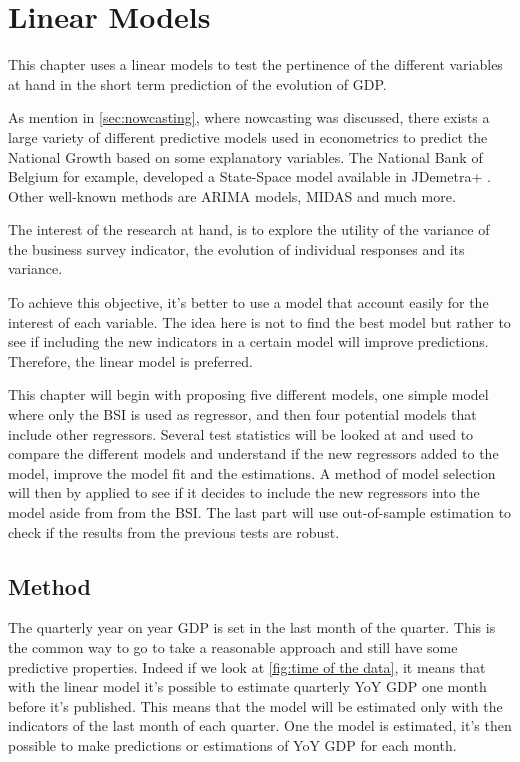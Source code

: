 \documentclass[12pt,a4paper,oneside]{book}
\begin{document}
\chapter{Linear Models}

This chapter uses a linear models to test the pertinence of the different variables at hand in the short term prediction of the evolution of GDP.

As mention in \autoref{sec:nowcasting}, where nowcasting was discussed, there exists a large variety of different predictive models used in econometrics to predict the National Growth based on some explanatory variables.
The National Bank of Belgium for example, developed a State-Space model available in JDemetra+ \cite{de_antonio_liedo_nowcasting_2014}. Other well-known methods are ARIMA models, MIDAS and much more.

The interest of the research at hand, is to explore the utility of the variance of the business survey indicator, the evolution of individual responses and its variance.

To achieve this objective, it's better to use a model that account easily for the interest of each variable. The idea here is not to find the best model but rather to see if including the new indicators in a certain model will improve predictions.
Therefore, the linear model is preferred.

This chapter will begin with proposing five different models, one simple model where only the BSI is used as regressor, and then four potential models that include other regressors.
Several test statistics will be looked at and used to compare the different models and understand if the new regressors added to the model, improve the model fit and the estimations.
A method of model selection will then by applied to see if it decides to include the new regressors into the model aside from from the BSI.
The last part will use out-of-sample estimation to check if the results from the previous tests are robust.

\section{Method}

The quarterly year on year GDP is set in the last month of the quarter. This is the common way to go to take a reasonable approach and still have some predictive properties.
Indeed if we look at \autoref{fig:time of the data}, it means that with the linear model it's possible to estimate quarterly YoY GDP one month before it's published. 
This means that the model will be estimated only with the indicators of the last month of each quarter. One the model is estimated, it's then possible to make predictions or estimations of YoY GDP for each month.
\end{document}
